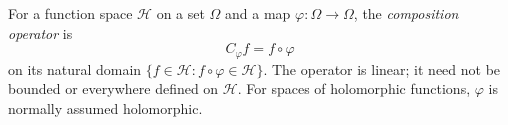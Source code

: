 
For a function space $\mathcal H$ on a set $\Omega$ and a map $\varphi:\Omega\to\Omega$, the \emph{composition operator} is
\[
C_\varphi f=f\circ\varphi
\]
on its natural domain $\{f\in\mathcal H:f\circ\varphi\in\mathcal H\}$. The operator is linear; it need not be bounded or everywhere defined on $\mathcal H$. For spaces of holomorphic functions, $\varphi$ is normally assumed holomorphic.
